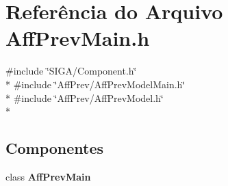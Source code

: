 \section{Referência do Arquivo Aff\+Prev\+Main.\+h}
\label{_aff_prev_main_8h}
{\ttfamily \#include \char`\"{}S\+I\+G\+A/\+Component.\+h\char`\"{}}\\*
{\ttfamily \#include \char`\"{}Aff\+Prev/\+Aff\+Prev\+Model\+Main.\+h\char`\"{}}\\*
{\ttfamily \#include \char`\"{}Aff\+Prev/\+Aff\+Prev\+Model.\+h\char`\"{}}\\*
\subsection*{Componentes}
\begin{DoxyCompactItemize}
\item 
class {\bf Aff\+Prev\+Main}
\end{DoxyCompactItemize}
